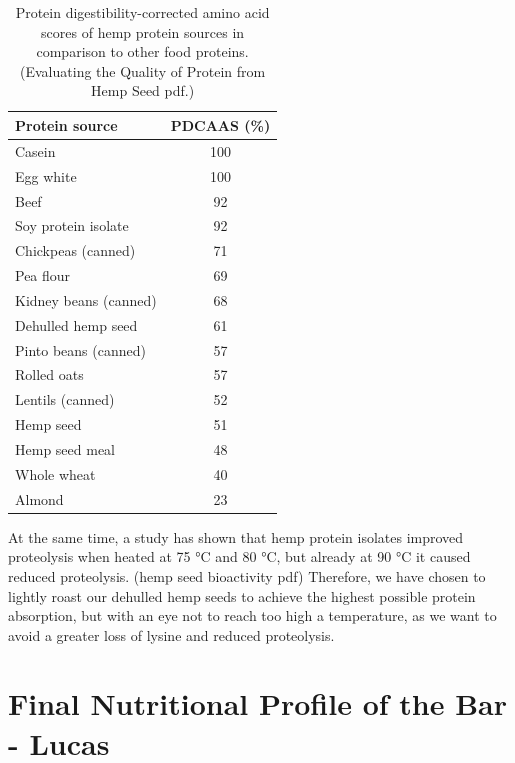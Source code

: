 \begin{table}[h]
    \centering
    \caption{Protein digestibility-corrected amino acid scores of hemp protein sources in comparison to other food proteins. (Evaluating the Quality of Protein from Hemp Seed pdf.)}
    \label{tab:process_table_01}
    \begin{tabular}{l c}
    \hline
    \textbf{Protein source} & \textbf{PDCAAS (\%)} \\
    \hline
    Casein               & 100 \\
    Egg white            & 100 \\
    Beef                 & 92  \\
    Soy protein isolate  & 92  \\
    Chickpeas (canned)   & 71  \\
    Pea flour            & 69  \\
    Kidney beans (canned)& 68  \\
    Dehulled hemp seed   & 61  \\
    Pinto beans (canned) & 57  \\
    Rolled oats          & 57  \\
    Lentils (canned)     & 52  \\
    Hemp seed            & 51  \\
    Hemp seed meal       & 48  \\
    Whole wheat          & 40  \\
    Almond               & 23  \\
    \hline
    \end{tabular}
\end{table}

\vspace{1em}
At the same time, a study has shown that hemp protein isolates improved proteolysis when heated at 75 °C and 80 °C, but already at 90 °C it caused reduced proteolysis. (hemp seed bioactivity pdf) Therefore, we have chosen to lightly roast our dehulled hemp seeds to achieve the highest possible protein absorption, but with an eye not to reach too high a temperature, as we want to avoid a greater loss of lysine and reduced proteolysis.


\section{Final Nutritional Profile of the Bar - Lucas}
